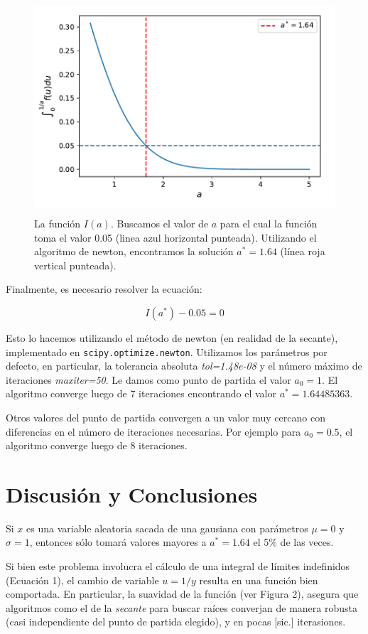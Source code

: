 \documentclass[letter, 11pt]{article}
\begin{document}
\begin{figure}[!hb]
  \centering
  \includegraphics[height=8cm]{../solucion/solucion.pdf}
  \caption{La función $I(a)$. Buscamos el valor de $a$ para el cual la función
  toma el valor 0.05 (linea azul horizontal punteada). Utilizando el algoritmo
de newton, encontramos la solución $a^*=1.64$ (línea roja vertical punteada).}
\end{figure}

Finalmente, es necesario resolver la ecuación:

\begin{equation}
  I(a^*) - 0.05 = 0
\end{equation}

Esto lo hacemos utilizando el método de newton (en realidad de la secante),
implementado en \texttt{scipy.optimize.newton}. Utilizamos los parámetros por
defecto, en particular, la tolerancia absoluta {\it tol=1.48e-08} y el número
máximo de iteraciones {\it maxiter=50}. Le damos como punto de partida el valor
$a_0=1$. El algoritmo converge luego de $7$ iteraciones encontrando el valor
$a^*= 1.64485363$.

Otros valores del punto de partida convergen a un valor muy cercano con
diferencias en el número de iteraciones necesarias. Por ejemplo para $a_0=0.5$,
el algoritmo converge luego de 8 iteraciones.

\section{Discusión y Conclusiones}

Si $x$ es una variable aleatoria sacada de una gausiana con parámetros $\mu=0$
y $\sigma=1$, entonces sólo tomará valores mayores a $a^*=1.64$ el 5\% de las
veces.

Si bien este problema involucra el cálculo de una integral de límites
indefinidos (Ecuación 1), el cambio de variable $u = 1/y$ resulta en una
función bien comportada. En particular, la suavidad de la función (ver Figura
2), asegura que algoritmos como el de la {\it secante} para buscar raíces
converjan de manera robusta (casi independiente del punto de partida elegido),
y en pocas [sic.] iterasiones.
\end{document}
